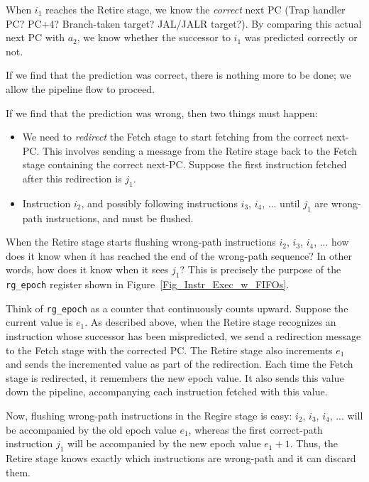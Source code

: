 When $i_1$ reaches the Retire stage, we know the \emph{correct} next
PC (Trap handler PC?  PC+4?  Branch-taken target?  JAL/JALR target?).
By comparing this actual next PC with $a_2$, we know whether the
successor to $i_1$ was predicted correctly or not.

If we find that the prediction was correct, there is nothing more to
be done; we allow the pipeline flow to proceed.


If we find that the prediction was wrong, then two things must happen:

\begin{itemize}

  \item We need to \emph{redirect} the Fetch stage to start fetching
    from the correct next-PC.  This involves sending a message from
    the Retire stage back to the Fetch stage containing the correct
    next-PC.  Suppose the first instruction fetched after this
    redirection is $j_1$.

  \item Instruction $i_2$, and possibly following instructions $i_3$,
    $i_4$, ... until $j_1$ are wrong-path instructions, and must be
    flushed.

\end{itemize}


When the Retire stage starts flushing wrong-path instructions $i_2$,
$i_3$, $i_4$, ... how does it know when it has reached the end of the
wrong-path sequence?  In other words, how does it know when it sees
$j_1$?  This is precisely the purpose of the \verb|rg_epoch| register
shown in Figure~\ref{Fig_Instr_Exec_w_FIFOs}.

Think of \verb|rg_epoch| as a counter that continuously counts upward.
Suppose the current value is $e_1$.  As described above, when the
Retire stage recognizes an instruction whose successor has been
mispredicted, we send a redirection message to the Fetch stage with
the corrected PC. The Retire stage also increments $e_1$ and sends the
incremented value as part of the redirection.  Each time the Fetch
stage is redirected, it remembers the new epoch value.  It also sends
this value down the pipeline, accompanying each instruction fetched
with this value.

Now, flushing wrong-path instructions in the Regire stage is easy:
$i_2$, $i_3$, $i_4$, ... will be accompanied by the old epoch value
$e_1$, whereas the first correct-path instruction $j_1$ will be
accompanied by the new epoch value $e_1+1$.  Thus, the Retire stage
knows exactly which instructions are wrong-path and it can discard
them.

